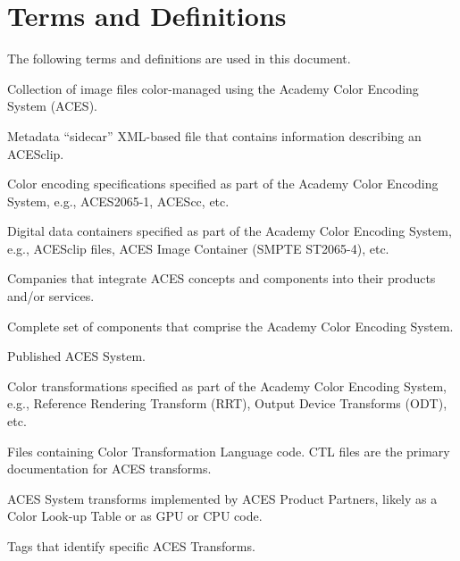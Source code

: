 \numberedformat
\chapter{Terms and Definitions}
The following terms and definitions are used in this document.

Collection of image files color-managed using the Academy Color Encoding System (ACES).

Metadata “sidecar” XML-based file that contains information describing an ACESclip.

Color encoding specifications specified as part of the Academy Color Encoding System, e.g., ACES2065-1, ACEScc, etc.

Digital data containers specified as part of the Academy Color Encoding System, e.g., ACESclip files, ACES Image Container (SMPTE ST2065-4), etc.

Companies that integrate ACES concepts and components into their products and/or services.

Complete set of components that comprise the Academy Color Encoding System.

Published ACES System.

Color transformations specified as part of the Academy Color Encoding System, e.g., Reference Rendering Transform (RRT), Output Device Transforms (ODT), etc.

Files containing Color Transformation Language code. CTL files are the primary documentation for ACES transforms.

ACES System transforms implemented by ACES Product Partners, likely as a Color Look-up Table or as GPU or CPU code.

Tags that identify specific ACES Transforms.
